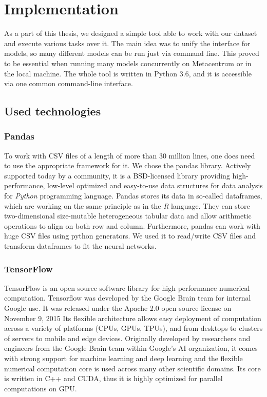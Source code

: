 \chapter{Implementation}
\label{chapter-implementation}

As a part of this thesis, we designed a simple tool able to work with our dataset and execute various tasks over it. The main idea was to unify the interface for models, so many different models can be run just via command line. This proved to be essential when running many models concurrently on Metacentrum or in the local machine. The whole tool is written in Python 3.6, and it is accessible via one common command-line interface.

\section{Used technologies}

\subsection{Pandas}

To work with CSV files of a length of more than 30 million lines, one does need to use the appropriate framework for it. We chose the pandas\cite{pandas} library. Actively supported today by a community, it is a BSD-licensed library providing high-performance, low-level optimized and easy-to-use data structures for data analysis for \textit{Python} programming language. Pandas stores its data in so-called dataframes\cite{pandas-df}, which are working on the same principle as in the \textit{R} language. They can store two-dimensional size-mutable heterogeneous tabular data and allow arithmetic operations to align on both row and column. Furthermore, pandas can work with huge CSV files using python generators. We used it to read/write CSV files and transform dataframes to fit the neural networks. 

\subsection{TensorFlow}

TensorFlow\cite{tensorflow} is an open source software library for high performance numerical computation. Tensorflow was developed by the Google Brain team for internal Google use. It was released under the Apache 2.0 open source license on November 9, 2015 Its flexible architecture allows easy deployment of computation across a variety of platforms (CPUs, GPUs, TPUs), and from desktops to clusters of servers to mobile and edge devices. Originally developed by researchers and engineers from the Google Brain team within Google’s AI organization, it comes with strong support for machine learning and deep learning and the flexible numerical computation core is used across many other scientific domains. Its core is written in C++ and CUDA, thus it is highly optimized for parallel computations on GPU.

